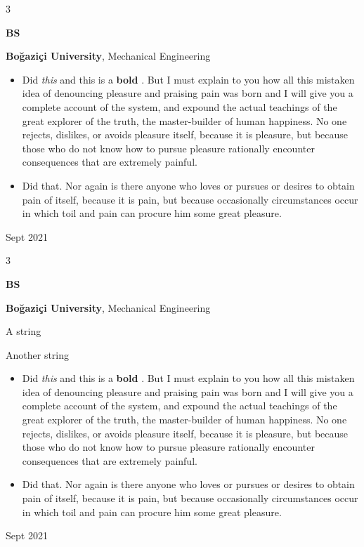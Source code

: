 \documentclass[10pt, letterpaper]{article}
\newenvironment{summary}{
    \begin{description}[
        topsep=0.10 cm,
        parsep=0.10 cm,
        partopsep=0pt,
        itemsep=0pt,
        leftmargin=0.4 cm + 10pt
    ]
}{
    \end{description}
} %
\newenvironment{highlights}{
    \begin{itemize}[
        topsep=0.10 cm,
        parsep=0.10 cm,
        partopsep=0pt,
        itemsep=0pt,
        leftmargin=0.4 cm + 10pt
    ]
}{
    \end{itemize}
} %
\newenvironment{threecolentry}[3][]{
    \onecolentry
    \def\thirdColumn{#3}
    \setcolumnwidth{1 cm, \fill, 4.5 cm}
    \begin{paracol}{3}
    {\raggedright #2} \switchcolumn
}{
    \switchcolumn \raggedleft \thirdColumn
    \end{paracol}
    \endonecolentry
} %
\let\hrefWithoutArrow\href
\renewcommand{\href}[2]{\hrefWithoutArrow{#1}{\ifthenelse{\equal{#2}{}}{ }{#2 }\raisebox{.15ex}{\footnotesize \faExternalLink*}}}
\begin{document}
        \vspace{0.2 cm}

        \begin{threecolentry}{\textbf{BS}}{
            Sept 2021
        }
            \textbf{Boğaziçi University}, Mechanical Engineering
            \begin{highlights}
                \item Did \textit{this} and this is a \textbf{bold} \href{https://example.com}{link}. But I must explain to you how all this mistaken idea of denouncing pleasure and praising pain was born and I will give you a complete account of the system, and expound the actual teachings of the great explorer of the truth, the master-builder of human happiness. No one rejects, dislikes, or avoids pleasure itself, because it is pleasure, but because those who do not know how to pursue pleasure rationally encounter consequences that are extremely painful.
                \item Did that. Nor again is there anyone who loves or pursues or desires to obtain pain of itself, because it is pain, but because occasionally circumstances occur in which toil and pain can procure him some great pleasure.
            \end{highlights}
        \end{threecolentry}

        \vspace{0.2 cm}

        \begin{threecolentry}{\textbf{BS}}{
            Sept 2021
        }
            \textbf{Boğaziçi University}, Mechanical Engineering
            \begin{summary}
                \item A string
                \item Another string
            \end{summary}
            \begin{highlights}
                \item Did \textit{this} and this is a \textbf{bold} \href{https://example.com}{link}. But I must explain to you how all this mistaken idea of denouncing pleasure and praising pain was born and I will give you a complete account of the system, and expound the actual teachings of the great explorer of the truth, the master-builder of human happiness. No one rejects, dislikes, or avoids pleasure itself, because it is pleasure, but because those who do not know how to pursue pleasure rationally encounter consequences that are extremely painful.
                \item Did that. Nor again is there anyone who loves or pursues or desires to obtain pain of itself, because it is pain, but because occasionally circumstances occur in which toil and pain can procure him some great pleasure.
            \end{highlights}
        \end{threecolentry}
\end{document}
